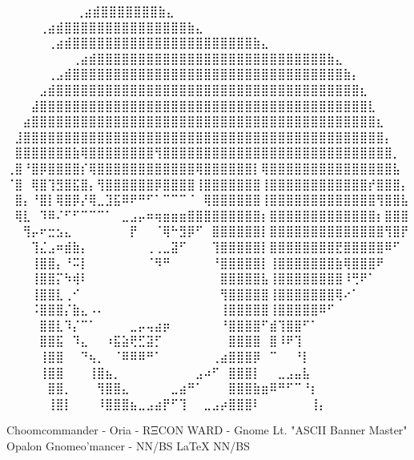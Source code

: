 ⠀⠀⠀⠀⠀⠀             ⠀⠀⢀⣴⣾⣿⣿⣿⣿⣿⣿⣿⣷⣄⠀⠀⠀⠀⠀⠀⠀⠀
⠀⠀⠀  ⠀      ⠀⠀⠀⠀⢀⣴⣾⣿⣿⣿⣿⣿⣿⣿⣿⣿⣿⣿⣿⣿⣿⣿⣷⣄⠀⠀⠀⠀⠀⠀⠀⠀
⠀⠀ ⠀   ⠀⠀⠀⠀⠀⢀⣴⣾⣿⣿⣿⣿⣿⣿⣿⣿⣿⣿⣿⣿⣿⣿⣿⣿⣿⣿⣿⣿⣿⣿⣷⣄⠀⠀⠀⠀⠀⠀⠀⠀
⠀⠀⠀⠀⠀⠀⠀⠀⢀⣴⣾⣿⣿⣿⣿⣿⣿⣿⣿⣿⣿⣿⣿⣿⣿⣿⣿⣿⣿⣿⣿⣿⣿⣿⣿⣿⣿⣿⣿⣷⣄⠀⠀⠀⠀⠀⠀⠀⠀
⠀⠀⠀⠀⠀⢀⣠⣾⣿⣿⣿⣿⣿⣿⣿⣿⣿⣿⣿⣿⣿⣿⣿⣿⣿⣿⣿⣿⣿⣿⣿⣿⣿⣿⣿⣿⣿⣿⣿⣿⣿⣷⡄⠀⠀⠀⠀⠀⠀
⠀⠀⠀⠀⣠⣾⣿⣿⣿⣿⣿⣿⣿⣿⣿⣿⣿⣿⣿⣿⣿⣿⣿⣿⣿⣿⣿⣿⣿⣿⣿⣿⣿⣿⣿⣿⣿⣿⣿⣿⣿⣿⣿⣆⠀⠀⠀⠀⠀
⠀⠀⠀⣼⣿⣿⣿⣿⣿⣿⣿⣿⣿⣿⣿⣿⣿⣿⣿⣿⣿⣿⣿⣿⣿⣿⣿⣿⣿⣿⣿⣿⣿⣿⣿⣿⣿⣿⣿⣿⣿⣿⣿⣿⣇⠀⠀⠀⠀
⠀⠀⣴⣿⣿⣿⣿⣿⣿⣿⣿⣿⣿⣿⣿⣿⣿⣿⣿⣿⣿⣿⣿⣿⣿⣿⣿⣿⣿⣿⣿⣿⣿⣿⣿⣿⣿⣿⣿⣿⣿⣿⣿⣿⣿⣆⠀⠀⠀
⠀⣸⣿⣿⣿⣿⣿⣿⣿⣿⣿⣿⣿⣿⣿⣿⣿⣿⣿⣿⣿⣿⣿⣿⣿⣿⣿⣿⣿⣿⣿⣿⣿⣿⣿⣿⣿⣿⣿⣿⣿⣿⣿⣿⣿⣿⡄⠀⠀
⠀⣿⣿⣿⣿⣿⣿⣿⣷⢿⣿⣿⣿⣿⣿⣿⣿⣿⢻⣿⣿⣿⣿⣿⣿⣿⣿⣿⣿⣿⣿⣿⣿⣿⣿⣿⣿⣿⣿⣿⣿⣿⣿⣿⣿⣿⣿⡀⠀
⢀⣿⠘⣿⡿⣿⣿⣿⣿⡎⢿⣿⣿⣿⣿⣿⣿⣿⣿⣿⣿⣿⣿⢿⣿⣿⣿⣿⣿⣿⡇⢿⣿⣿⣿⣿⣿⣿⣿⣿⣿⣿⣿⣿⣿⣿⣿⣧⠀
⠈⣿⠀⢿⣿⢹⣻⣿⣯⣿⡄⢻⣿⣿⣿⣿⣿⣿⡿⣿⣿⣿⣿⢸⣿⣿⣿⣿⣿⣿⣿⢸⣿⣿⣿⣿⣿⣿⣿⣿⣿⣿⣿⣿⡞⣿⣿⣿⡄
⠀⣿⡄⠘⣿⡇⢿⣿⡿⡜⢿⣀⣹⣯⠿⠟⠛⠋⠁⠉⠉⠉⠈⠀⢿⣿⣿⣿⣿⣿⣿⢸⣿⣿⣿⣿⣿⣿⣿⣿⣿⣿⣿⣿⣿⢻⣿⣿⣧
⠀⢿⣇⠀⠹⠿⠌⠋⠋⠉⠉⠉⠁⠀⣀⣠⡤⠶⢶⣶⣶⣶⣿⣿⣿⣿⣿⣿⣿⣿⣿⡆⣿⣿⣿⣿⣿⣿⣿⣿⣿⣿⣿⣿⣿⡆⣿⣿⣿
⠀⠀⢻⡤⠖⣒⣢⣄⠀⠀⠀⠀⠀⠀⠀⡟⠀⠀⠈⢿⠓⣻⡿⠋⠀⣿⣿⣿⣿⣿⣿⡇⣿⣿⣿⣿⣿⣿⣿⣿⣿⣿⣿⣿⣿⣿⢻⣿⡟
⠀⠀⠀⢹⣌⣠⠶⣾⣷⡄⠀⠀⠀⠀⠀⠀⠀⢀⢀⣀⣽⠋⠀⠀⠀⢹⣿⣿⣿⣿⣿⡇⣿⣿⣿⣿⣿⣿⣿⣿⣟⣿⣿⣿⣿⣿⠿⠋⠀
⠀⠀⠀⢸⣿⣿⡄⠘⠭⡇⠀⠀⠀⠀⠀⠀⠀⠈⠻⠛⠀⠀⠀⠀⠀⠘⣿⣿⣿⣿⣿⡇⢸⣿⣿⣿⣿⣿⣿⣿⣷⢿⣿⣿⣿⠟⠀⠀⠀
⠀⠀⠀⢸⣿⣿⡍⠳⢾⠇⠀⠀⠀⠀⠀⠀⠀⠀⠀⠀⠀⠀⠀⠀⠀⠀⣿⣿⣿⣿⣿⣧⢸⣿⣿⣿⣿⣿⣿⣿⣿⠸⢛⠟⠁⠀⠀⠀⠀
⠀⠀⠀⢸⣿⣿⣇⢀⠊⠀⠀⠀⠀⠀⠀⠀⠀⠀⠀⠀⠀⠀⠀⠀⠀⠀⢻⣿⣿⣿⣿⣿⢸⣿⣿⣿⣿⣿⣿⣿⢿⠔⠁⠀⠀⠀⠀⠀⠀
⠀⠀⠀⠨⣿⣿⣿⡌⣷⣄⠠⠄⠀⠀⠀⠀⠀⠀⠀⠀⠀⠀⠀⠀⠀⠀⢸⣿⣿⣿⣿⣿⢸⣿⣿⣿⣿⣿⠿⠋⠀⠀⠀⠀⠀⠀⠀⠀⠀
⠀⠀⠀⠀⣿⣿⣇⠹⡌⠉⠁⠀⠀⠀⠀⣀⡤⢤⣴⡶⠀⠀⠀⠀⠀⠀⠘⣿⣿⣿⣿⠋⣾⢹⣿⣿⠋⠁⠀⠀⠀⠀⠀⠀⠀⠀⠀⠀⠀
⠀⠀⠀⠀⣿⣿⣯⠀⠹⣄⠀⠀⠰⣯⣵⢟⣋⣽⡋⠀⠀⠀⠀⠀⠀⠀⠀⣿⣿⣿⣿⠀⣿⠸⠟⢹⠀⠀⠀⠀⠀⠀⠀⠀⠀⠀⠀⠀⠀
⠀⠀⠀⠀⢸⣿⣿⠀⠀⠙⢦⡀⠀⠈⠿⠿⠿⠛⠁⠀⠀⠀⠀⠀⠀⢀⣴⣿⣿⣿⡿⠀⠉⠀⠀⠘⡇⠀⠀⠀⠀⠀⠀⠀⠀⠀⠀⠀⠀
⠀⠀⠀⠀⢸⣿⣿⠀⠀⠀⢸⣿⣦⡀⠀⠀⠀⠀⠀⠀⠀⠀⠀⣠⠴⠋⠀⣿⣿⣿⡇⠀⠀⣀⣠⣤⣧⠀⠀⠀⠀⠀⠀⠀⠀⠀⠀⠀⠀
⠀⠀⠀⠀⠀⣿⣿⡀⠀⠀⠀⢻⣿⣿⣄⠀⠀⠀⠀⠀⣀⣴⠛⠁⠀⠀⠀⣿⣿⣿⣷⣶⠿⠛⠋⠉⠘⡆⠀⠀⠀⠀⠀⠀⠀⠀⠀⠀⠀
⠀⠀⠀⠀⠀⢸⣿⡇⠀⠀⠀⠸⣿⣿⣿⣦⣀⣠⣴⡟⠋⢹⠀⠀⣀⣠⡴⣿⣿⣿⠇⠀⠀⠀⠀⠀⠀⢸⡄⠀⠀⠀⠀⠀⠀⠀⠀⠀⠀

Choomcommander - Oria - RΞCON WARD - Gnome Lt. "ASCII Banner Master"
             Opalon Gnomeo'mancer - NN/BS LaTeX{} NN/BS

